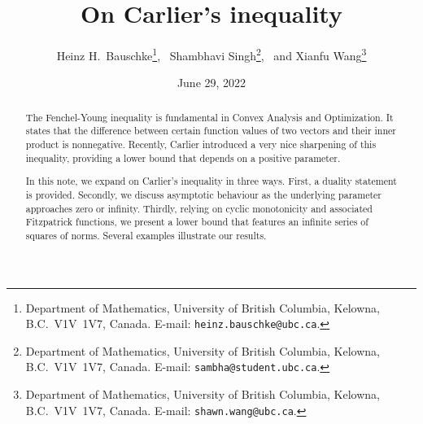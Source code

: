 \documentclass[12pt]{article}
\theoremstyle{definition}
\begin{document}
\title{\textsf{
On Carlier's inequality
}}

\author{
Heinz H.\ Bauschke\thanks{
Department of Mathematics, University
of British Columbia,
Kelowna, B.C.\ V1V~1V7, Canada. E-mail:
\texttt{heinz.bauschke@ubc.ca}.},~
Shambhavi Singh\thanks{
Department of Mathematics, University
of British Columbia,
Kelowna, B.C.\ V1V~1V7, Canada. E-mail:
\texttt{sambha@student.ubc.ca}.},~ 
and
Xianfu Wang\thanks{
Department of Mathematics, University
of British Columbia,
Kelowna, B.C.\ V1V~1V7, Canada. E-mail:
\texttt{shawn.wang@ubc.ca}.}
}

\date{June 29, 2022} 
\maketitle


\vskip 8mm

\begin{abstract} 
The Fenchel-Young inequality is fundamental in Convex Analysis and Optimization. It states that the difference between certain function values of two vectors and their inner product is nonnegative.
Recently, Carlier introduced a very nice sharpening of this inequality, 
providing a lower bound that depends on a positive parameter. 

In this note, we expand on Carlier's inequality in three ways. 
First, a duality statement is provided. Secondly, we discuss asymptotic behaviour as the underlying parameter approaches zero or infinity. 
Thirdly, relying on cyclic monotonicity and 
associated Fitzpatrick functions, we present a lower bound that features an infinite series of squares of norms. Several examples illustrate our results.
\end{abstract}
\end{document}
